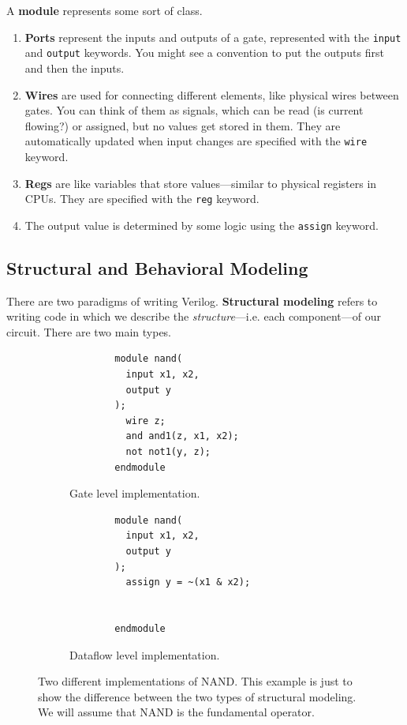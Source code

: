   \begin{definition}[Module]
    A \textbf{module} represents some sort of class. 
    \begin{enumerate}
      \item \textbf{Ports} represent the inputs and outputs of a gate, represented with the \texttt{input} and \texttt{output} keywords. You might see a convention to put the outputs first and then the inputs. 
      \item \textbf{Wires} are used for connecting different elements, like physical wires between gates. You can think of them as signals, which can be read (is current flowing?) or assigned, but no values get stored in them. They are automatically updated when input changes are specified with the \texttt{wire} keyword. 
      \item \textbf{Regs} are like variables that store values---similar to physical registers in CPUs. They are specified with the \texttt{reg} keyword. 
      \item The output value is determined by some logic using the \texttt{assign} keyword. 
    \end{enumerate}
  \end{definition}

\subsection{Structural and Behavioral Modeling}

  There are two paradigms of writing Verilog. \textbf{Structural modeling} refers to writing code in which we describe the \textit{structure}---i.e. each component---of our circuit. There are two main types. 

  \begin{figure}[H]
    \centering
    \begin{subfigure}[b]{0.48\textwidth}
      \centering
      \begin{lstlisting}
        module nand(
          input x1, x2,
          output y
        );
          wire z; 
          and and1(z, x1, x2); 
          not not1(y, z);
        endmodule
      \end{lstlisting}
      \caption{Gate level implementation.}
    \end{subfigure}
    \hfill 
    \begin{subfigure}[b]{0.48\textwidth}
      \centering
      \begin{lstlisting}
        module nand(
          input x1, x2,
          output y
        );
          assign y = ~(x1 & x2);


        endmodule
      \end{lstlisting}
      \caption{Dataflow level implementation.}
    \end{subfigure}
    \caption{Two different implementations of NAND. This example is just to show the difference between the two types of structural modeling. We will assume that NAND is the fundamental operator. }
  \end{figure}

